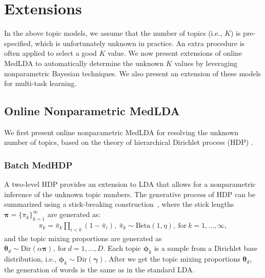\documentclass[twoside,11pt]{article}
\newcommand{\thetav}{\bm{\theta}}
\newcommand{\piv}{\bm \pi}
\begin{document}
\section{Extensions}\label{sec:extensions}
In the above topic models, we assume that the number of topics (i.e., $K$) is pre-specified, which is unfortunately unknown in practice. An extra procedure is often applied to select a good $K$ value. We now present extensions of online MedLDA to automatically determine the unknown $K$ values by leveraging nonparametric Bayesian techniques. We also present an extension of these models for multi-task learning.

\subsection{Online Nonparametric MedLDA}\label{sec:ohdp}

We first present online nonparametric MedLDA for resolving the unknown number of topics, based on the theory of hierarchical Dirichlet process (HDP) \citep{teh2006hierarchical}.

\subsubsection{Batch MedHDP} \label{sec:medhdp}

A two-level HDP provides an extension to LDA that allows for a nonparametric inference of the unknown topic numbers. The generative process of HDP can be summarized using a stick-breaking construction~\citep{wang2012truncation}, where the stick lengths $\bm{\pi} = \{\pi_k\}_{k = 1}^{\infty}$ are generated as:
%
\begin{equation*}
\begin{array}{l}
\pi_k = \bar{\pi}_k \prod\limits_{i < k}(1-\bar{\pi}_{i}), ~ \bar{\pi}_k \sim \text{Beta}(1,\eta),~ \textrm{for}~k=1, ..., \infty,
\end{array}
\end{equation*}
%
and the topic mixing proportions are generated as $\thetav_d \sim \text{Dir}(\alpha \piv),~\textrm{for}~d = 1,...,D$. Each topic $\bm{\phi}_k$ is a sample from a Dirichlet base distribution, i.e., $\bm{\phi}_k \sim \text{Dir}(\bm{\gamma})$. After we get the topic mixing proportions $\thetav_d$, the generation of words is the same as in the standard LDA.
\end{document}

